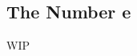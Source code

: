 \documentclass[../poma-notes.tex]{subfiles}
\begin{document}
\subsection*{The Number e}

WIP
\end{document}
